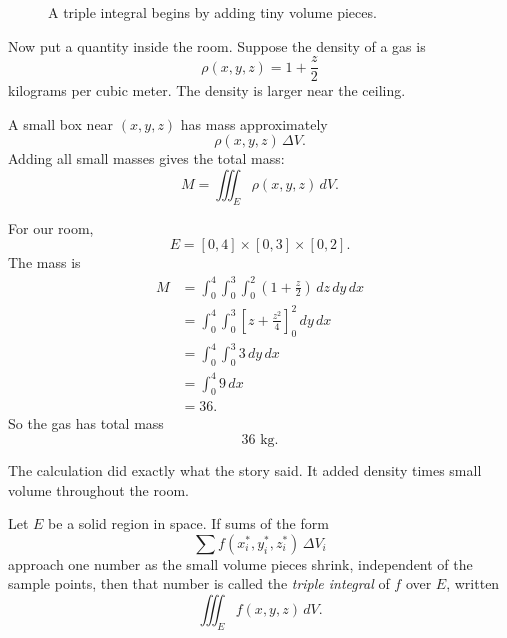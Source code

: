 \begin{figure}[h]
\caption{A triple integral begins by adding tiny volume pieces.}
\end{figure}

Now put a quantity inside the room.  Suppose the density of a gas is
\[
    \rho(x,y,z)=1+\frac z2
\]
kilograms per cubic meter.  The density is larger near the ceiling.

A small box near \((x,y,z)\) has mass approximately
\[
    \rho(x,y,z)\,\Delta V.
\]
Adding all small masses gives the total mass:
\[
\boxed{
    M=\iiint_E \rho(x,y,z)\,dV.
}
\]

For our room,
\[
    E=[0,4]\times[0,3]\times[0,2].
\]
The mass is
\[
\begin{aligned}
M
&=
\int_0^4\int_0^3\int_0^2
\left(1+\frac z2\right)\,dz\,dy\,dx\\
&=
\int_0^4\int_0^3
\left[
z+\frac{z^2}{4}
\right]_{0}^{2}
\,dy\,dx\\
&=
\int_0^4\int_0^3 3\,dy\,dx\\
&=
\int_0^4 9\,dx\\
&=
36.
\end{aligned}
\]
So the gas has total mass
\[
\boxed{
    36\text{ kg}.
}
\]

The calculation did exactly what the story said.  It added density times small volume
throughout the room.

\begin{definition}
Let \(E\) be a solid region in space.  If sums of the form
\[
    \sum f(x_i^*,y_i^*,z_i^*)\,\Delta V_i
\]
approach one number as the small volume pieces shrink, independent of the sample
points, then that number is called the \emph{triple integral} of \(f\) over \(E\), written
\[
\boxed{
    \iiint_E f(x,y,z)\,dV.
}
\]
\end{definition}

